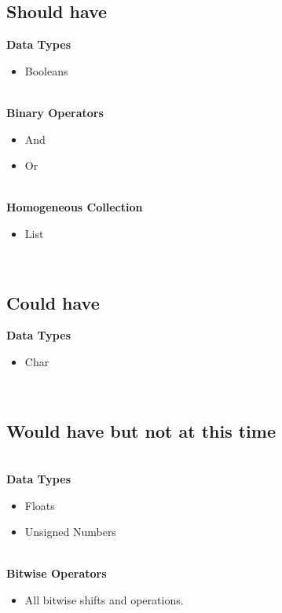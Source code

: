 \subsection{Should have }
\textbf{Data Types }
\begin{itemize} 
    \item Booleans
\end{itemize} 
\\
\textbf{Binary Operators} 
\begin{itemize} 
    \item And
    \item Or
\end{itemize} 
\\
\textbf{Homogeneous Collection }
\begin{itemize} 
    \item List
\end{itemize} 
\\
\subsection{Could have}
\textbf{Data Types }
\begin{itemize} 
    \item Char
\end{itemize} 
\\
\subsection{Would have but not at this time }
\\
\textbf{Data Types }
\begin{itemize} 
    \item Floats
    \item Unsigned Numbers
\end{itemize} 
\\
\textbf{Bitwise Operators }
\begin{itemize} 
    \item All bitwise shifts and operations. 
\end{itemize} 

 

 

 

 

 

 

 